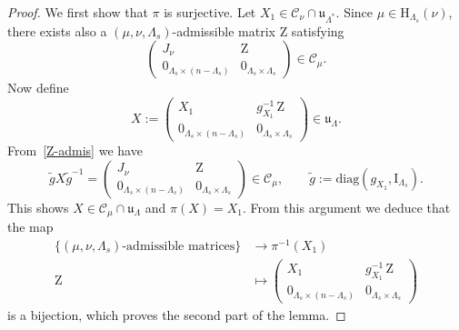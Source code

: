 \documentclass[12pt,a4paper,reqno]{amsart}
\theoremstyle{plain}
\theoremstyle{definition}
\newcommand{\1}{\mathds{1}}
\newcommand{\C}{\mathcal{C}}
\newcommand{\HH}{\mathrm{H}}
\newcommand{\Z}{\mathrm{Z}}
\renewcommand{\u}{\mathfrak{u}}
\begin{document}
\begin{proof} We first show that $\pi$ is surjective. Let $X_1\in \C_\nu\cap\u_{\Lambda^*}$. Since $\mu\in \HH_{\Lambda_s}(\nu)$, there exists also a $(\mu,\nu,\Lambda_s)$-admissible matrix $\Z$ satisfying
\begin{equation}\label{Z-admis}
\left(\begin{array}{c|c}
J_{\nu} & \Z\\ \hline
0_{\Lambda_s\times (n-\Lambda_s)} & 0_{\Lambda_s\times \Lambda_s}
\end{array}\right)\in \C_\mu. 
\end{equation}
Now define 
$$
X:=\left(\begin{array}{c|c}
X_1 & g_{X_1}^{-1}\,\Z\\ \hline
0_{\Lambda_s\times (n-\Lambda_s)} & 0_{\Lambda_s\times \Lambda_s}
\end{array}\right)\in \u_\Lambda.
$$
From~\cref{Z-admis} we have
\begin{equation}
\tilde gX\tilde g^{-1}
=\left(\begin{array}{c|c}
J_\nu & \Z\\ \hline
0_{\Lambda_s\times (n-\Lambda_s)} & 0_{\Lambda_s\times \Lambda_s}
\end{array}\right)\in \C_\mu,  \qquad \tilde{g}:=\mathrm{diag}(g_{X_1}^{},\mathrm{I}_{\Lambda_s}).
\end{equation}
This shows $X\in \C_\mu\cap \u_\Lambda$ and $\pi(X)=X_1$. From this argument we  deduce that the map
\begin{equation*}
\begin{split}
\{(\mu,\nu,\Lambda_s)\text{-admissible matrices}\} & \rightarrow \pi^{-1}(X_1)\\
\Z & \longmapsto \left(\begin{array}{c|c}
X_1 & g_{X_1}^{-1}\,\Z\\ \hline
0_{\Lambda_s\times (n-\Lambda_s)} & 0_{\Lambda_s\times \Lambda_s}
\end{array}\right)
\end{split}
\end{equation*}
is a bijection, which proves the second part of the lemma. 
\end{proof}
\end{document}
